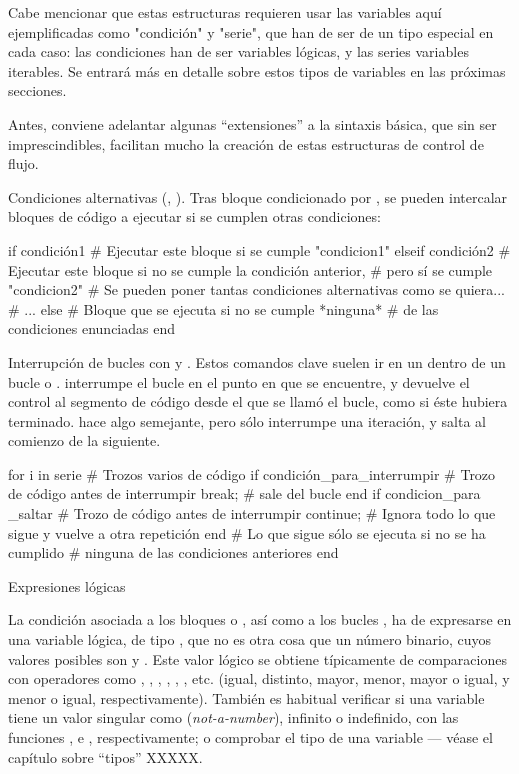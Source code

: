 ﻿\documentclass[spanish]{article}
\begin{document}
Cabe mencionar que estas estructuras requieren usar las variables aquí
ejemplificadas como "condición" y "serie", que han de ser de un tipo especial
en cada caso: las condiciones han de ser variables lógicas, y las series
variables iterables. Se entrará más en detalle sobre estos tipos de variables
en las próximas secciones.

Antes, conviene adelantar algunas ``extensiones'' a la sintaxis básica,
que sin ser imprescindibles, facilitan mucho la creación de estas estructuras
de control de flujo.

Condiciones alternativas (, ). Tras bloque condicionado
por , se pueden intercalar bloques de código a ejecutar si se
cumplen otras condiciones:

if condición1
  # Ejecutar este bloque si se cumple "condicion1"
elseif condición2
  # Ejecutar este bloque si no se cumple la condición anterior,
  # pero sí se cumple "condicion2"
  # Se pueden poner tantas condiciones alternativas como se quiera...
  # ...
else
  # Bloque que se ejecuta si no se cumple *ninguna*
  # de las condiciones enunciadas
end

Interrupción de bucles con  y . Estos comandos
clave suelen ir en un  dentro de un bucle  o .
 interrumpe el bucle en el punto en que se encuentre, y devuelve
el control al segmento de código desde el que se llamó el bucle, como si
éste hubiera terminado.  hace algo semejante, pero sólo
interrumpe una iteración, y salta al comienzo de la siguiente.

for i in serie
  # Trozos varios de código
  if condición_para_interrumpir
    # Trozo de código antes de interrumpir
    break; # sale del bucle
  end
  if condicion_para _saltar
    # Trozo de código antes de interrumpir
    continue;  # Ignora todo lo que sigue y vuelve a otra repetición
  end
  # Lo que sigue sólo se ejecuta si no se ha cumplido
  # ninguna de las condiciones anteriores
end


Expresiones lógicas

La condición asociada a los bloques  o , así como a los
bucles , ha de expresarse en una variable lógica, de tipo
, que no es otra cosa que un número binario, cuyos valores posibles
son  y .
Este valor lógico se obtiene típicamente de comparaciones con operadores como
\code{==}, \code{!=}, \code{>}, \code{>=}, \code{<}, \code{<=}, etc.
(igual, distinto, mayor, menor, mayor o igual, y menor o igual, respectivamente).
También es habitual verificar si una variable tiene un valor singular
como  (\emph{not-a-number}), infinito o indefinido, con las funciones
,  e , respectivamente;
o comprobar el tipo de una variable --- véase el capítulo sobre ``tipos'' XXXXX.
\end{document}
